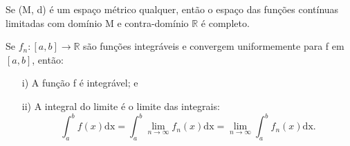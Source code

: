 \documentclass[../analysisII_notes.tex]{subfiles}
\begin{document}
\begin{crl*}
	Se (M, d) é um espaço métrico qualquer, então o espaço das funções contínuas limitadas com domínio M e contra-domínio \(\mathbb{R}\) é completo.
\end{crl*}
\begin{theorem*}
	Se \(f_{n}:[a, b]\rightarrow \mathbb{R}\) são funções integráveis e convergem uniformemente para f em \([a, b]\), então:
	\begin{itemize}
		\item[i)] A função f é integrável; e
		\item[ii)] A integral do limite é o limite das integrais:
		      \[
			      \int_{a}^{b}f(x) \mathrm{dx} = \int_{a}^{b}\lim_{n\to \infty}f_{n}(x) \mathrm{dx} = \lim_{n\to \infty}\int_{a}^{b}f_{n}(x) \mathrm{dx}.
		      \]
	\end{itemize}
\end{theorem*}
\end{document}
